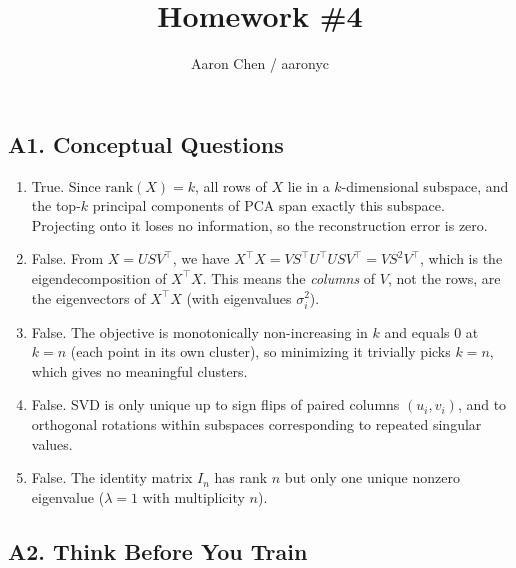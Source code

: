 \documentclass[fleqn]{article}
\begin{document}
\title{Homework \#4}
\author{Aaron Chen / aaronyc}
\date{}
\maketitle


\subsection*{A1. Conceptual Questions}

\begin{enumerate}[label=(\alph*)]
\item
True. Since $\mathrm{rank}(X) = k$, all rows of $X$ lie in a $k$-dimensional subspace, and the top-$k$ principal components of PCA span exactly this subspace. Projecting onto it loses no information, so the reconstruction error is zero.

\item
False. From $X = USV^\top$, we have $X^\top X = V S^\top U^\top U S V^\top = V S^2 V^\top$, which is the eigendecomposition of $X^\top X$. This means the \emph{columns} of $V$, not the rows, are the eigenvectors of $X^\top X$ (with eigenvalues $\sigma_i^2$).

\item
False. The objective is monotonically non-increasing in $k$ and equals $0$ at $k = n$ (each point in its own cluster), so minimizing it trivially picks $k = n$, which gives no meaningful clusters.

\item
False. SVD is only unique up to sign flips of paired columns $(u_i, v_i)$, and to orthogonal rotations within subspaces corresponding to repeated singular values.

\item
False. The identity matrix $I_n$ has rank $n$ but only one unique nonzero eigenvalue ($\lambda = 1$ with multiplicity $n$).
\end{enumerate}


\subsection*{A2. Think Before You Train}
\end{document}
